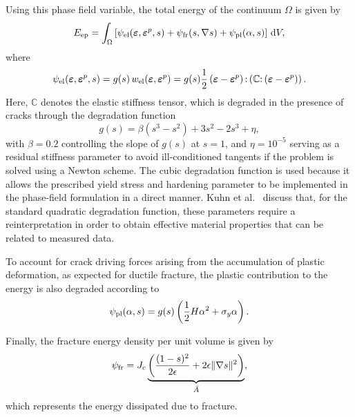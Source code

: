 \documentclass[pdflatex,sn-mathphys-num]{sn-jnl}%
\theoremstyle{thmstyleone}%
\theoremstyle{thmstyletwo}%
\theoremstyle{thmstylethree}%
\begin{document}
Using this phase field variable, the total energy of the continuum $\Omega$ is given by
\begin{equation}
    E_{\rm{ep}} = \int_{\Omega} \left[ 
    \psi_{\rm{el}}(\boldsymbol{\varepsilon},\boldsymbol{\varepsilon}^p,s) 
    + \psi_{\rm{fr}}(s,\nabla{s}) 
    + \psi_{\rm{pl}}(\alpha,s)
    \right] \, \mathrm{d}V,
\end{equation}
where
\begin{equation}
    \psi_{\rm{el}}(\boldsymbol{\varepsilon},\boldsymbol{\varepsilon}^p,s)
    = g(s)\,w_{\rm{el}}(\boldsymbol{\varepsilon},\boldsymbol{\varepsilon}^p)
    = g(s)\dfrac{1}{2}
    \left(\boldsymbol{\varepsilon}-\boldsymbol{\varepsilon}^p\right)
    {:}
    \left(\boldsymbol{\mathbb{C}}{:}
    \left(\boldsymbol{\varepsilon}-\boldsymbol{\varepsilon}^p\right)\right).
\end{equation}
Here, $\boldsymbol{\mathbb{C}}$ denotes the elastic stiffness tensor, which is degraded in the presence of cracks through the degradation function
\begin{equation}
    g(s) = \beta\left(s^3 - s^2\right) + 3s^2 - 2s^3 + \eta,
    \label{eq:deg_grad}
\end{equation}
with $\beta = 0.2$ controlling the slope of $g(s)$ at $s=1$, and $\eta = 10^{-5}$ serving as a residual stiffness parameter to avoid ill-conditioned tangents if the problem is solved using a Newton scheme.
The cubic degradation function is used because it allows the prescribed yield stress and hardening parameter to be implemented in the phase-field formulation in a direct manner.
Kuhn et al.~\cite{kuhn_phase_2016} discuss that, for the standard quadratic degradation function, these parameters require a reinterpretation in order to obtain effective material properties that can be related to measured data.

To account for crack driving forces arising from the accumulation of plastic deformation, as expected for ductile fracture, the plastic contribution to the energy is also degraded according to
\begin{equation}
    \psi_{\rm{pl}}(\alpha,s) = g(s)\left(\dfrac{1}{2}H\alpha^2 + \sigma_y\alpha\right).
\end{equation}


Finally, the fracture energy density per unit volume is given by
\begin{equation}
    \psi_{\rm{fr}} = J_c
    \underbrace{\left(
    \dfrac{(1-s)^2}{2\epsilon} + 2\epsilon\|\nabla{s}\|^2
    \right)}_{\bar{A}},
\end{equation}
which represents the energy dissipated due to fracture. 
\end{document}
